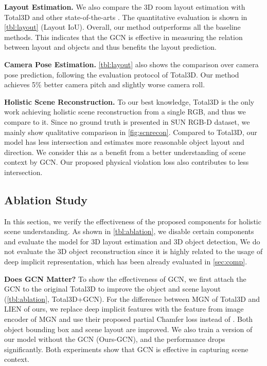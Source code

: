 \documentclass[final]{cvpr}
\let\orgautoref\autoref
\renewcommand{\autoref}[1]{\def\figureautorefname{Fig.}\orgautoref{#1}}
\begin{document}
\noindent \textbf{Layout Estimation.} 
We also compare the 3D room layout estimation with Total3D \cite{nie2020total3dunderstanding} and other state-of-the-arts \cite{choi2013understanding,huang2018holistic,huang2018cooperative}.
The quantitative evaluation is shown in \autoref{tbl:layout} (Layout IoU).
Overall, our method outperforms all the baseline methods.
This indicates that the GCN is effective in measuring the relation between layout and objects and thus benefits the layout prediction.



\noindent \textbf{Camera Pose Estimation.} 
\autoref{tbl:layout} also shows the comparison over camera pose prediction, following the evaluation protocol of Total3D.
Our method achieves 5\% better camera pitch and slightly worse camera roll.







\noindent \textbf{Holistic Scene Reconstruction.}
To our best knowledge, Total3D \cite{nie2020total3dunderstanding} is the only work achieving holistic scene reconstruction from a single RGB, and thus we compare to it.
Since no ground truth is presented in SUN RGB-D dataset, we mainly show qualitative comparison in \autoref{fig:scnrecon}. 
Compared to Total3D, our model has less intersection and estimates more reasonable object layout and direction.
We consider this as a benefit from a better understanding of scene context by GCN. Our proposed physical violation loss  also contributes to less intersection.



\subsection{Ablation Study}

In this section, we verify the effectiveness of the proposed components for holistic scene understanding. 
As shown in \autoref{tbl:ablation}, we disable certain components and evaluate the model for 3D layout estimation and 3D object detection, We do not evaluate the 3D object reconstruction since it is highly related to the usage of deep implicit representation, which has been already evaluated in \autoref{sec:comp}.

\noindent \textbf{Does GCN Matter?}
To show the effectiveness of GCN, we first attach the GCN to the original Total3D to improve the object and scene layout (\autoref{tbl:ablation}, Total3D+GCN).
For the difference between MGN of Total3D and LIEN of ours, we replace deep implicit features with the feature from image encoder of MGN and use their proposed partial Chamfer loss  instead of .
Both object bounding box and scene layout are improved.
We also train a version of our model without the GCN (Ours-GCN), and the performance drops significantly.
Both experiments show that GCN is effective in capturing scene context.
\end{document}
